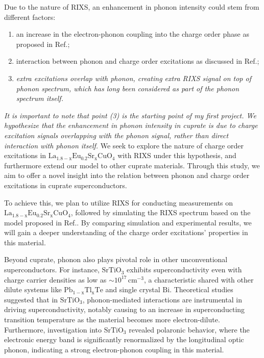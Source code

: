 \documentclass[11pt]{article}
\begin{document}
Due to the nature of RIXS, an enhancement in phonon intensity could stem from different factors: 
\begin{enumerate}
  \item an increase in the electron-phonon coupling into the charge order phase as proposed in Ref.\cite{wang_charge_2021,peng_electronic_2022}; 
  \item interaction between phonon and charge order excitations as discussed in Ref.\cite{li_multiorbital_2020, chaix_dispersive_2017,huang_quantum_2021};  
  \item \textit{extra excitations overlap with phonon, creating extra RIXS signal on top of phonon spectrum, which has long been considered as part of the phonon spectrum itself.} 
\end{enumerate}
\textit{It is important to note that point (3) is the starting point of my first project. We hypothesize that the enhancement in phonon intensity in cuprate is due to charge excitation signals overlapping with the phonon signal, rather than direct interaction with phonon itself.}  We seek to explore the nature of charge order excitations in $\mathrm{La_{1.8-x}Eu_{0.2}Sr_xCuO_{4}}$ with RIXS under this hypothesis, and furthermore extend our model to other cuprate materials. Through this study, we aim to offer a novel insight into the relation between phonon and charge order excitations in cuprate superconductors. 

To achieve this, we plan to utilize RIXS for conducting measurements on $\mathrm{La_{1.8-x}Eu_{0.2}Sr_xCuO_{4}}$, followed by simulating the RIXS spectrum based on the model proposed in Ref.\cite{devereaux_directly_2016}. By comparing simulation and experimental results, we will gain a deeper understanding of the charge order excitations' properties in this material. 

Beyond cuprate, phonon also plays pivotal role in other unconventional superconductors. For instance, $\mathrm{SrTiO_{3}}$ exhibits superconductivity even with charge carrier densities as low as $\sim 10^{17}\,\mathrm{cm^{-3}}$\cite{schooley_superconductivity_1964,lin_fermi_2013}, a characteristic shared with other dilute systems like $\mathrm{Pb_{1-x}Tl_{x}Te}$\cite{unknown} and single crystal $\mathrm{Bi}$\cite{prakash_evidence_2017}. Theoretical studies suggested that in $\mathrm{SrTiO_{3}}$, phonon-mediated interactions are instrumental in driving superconductivity, notably causing to an increase in superconducting transition temperature as the material becomes more electron-dilute\cite{gastiasoro_phonon-mediated_2019}. Furthermore, investigation into $\mathrm{SrTiO_{3}}$ revealed polaronic behavior, where the electronic energy band is significantly renormalized by the longitudinal optic phonon, indicating a strong electron-phonon coupling in this material\cite{swartz_polaronic_2018}. 
\end{document}
